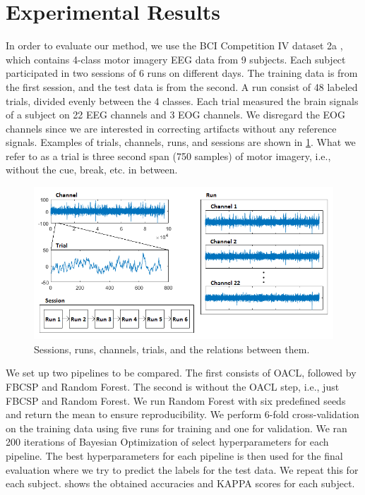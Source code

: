 \section{Experimental Results}

In order to evaluate our method, we use the BCI Competition IV dataset 2a \citep{brunner2008bci}, which contains 4-class motor imagery EEG data from 9 subjects. Each subject participated in two sessions of 6 runs on different days. The training data is from the first session, and the test data is from the second. A run consist of 48 labeled trials, divided evenly between the 4 classes. Each trial measured the brain signals of a subject on 22 EEG channels and 3 EOG channels. We disregard the EOG channels since we are interested in correcting artifacts without any reference signals. Examples of trials, channels, runs, and sessions are shown in \cref{fig:dataset}. What we refer to as a trial is three second span (750 samples) of motor imagery, i.e., without the cue, break, etc. in between.

\begin{figure}
	\centering
	\begin{adjustbox}{width=\textwidth}
		\includegraphics{figures/bciiv2a.png}
	\end{adjustbox}
	\caption{Sessions, runs, channels, trials, and the relations between them.}
	\label{fig:dataset}
\end{figure}

We set up two pipelines to be compared. The first consists of OACL, followed by FBCSP and Random Forest. The second is without the OACL step, i.e., just FBCSP and Random Forest. We run Random Forest with six predefined seeds and return the mean to ensure reproducibility. We perform 6-fold cross-validation on the training data using five runs for training and one for validation. We ran 200 iterations of Bayesian Optimization of select hyperparameters for each pipeline. The best hyperparameters for each pipeline is then used for the final evaluation where we try to predict the labels for the test data. We repeat this for each subject.  shows the obtained accuracies and KAPPA scores for each subject.

